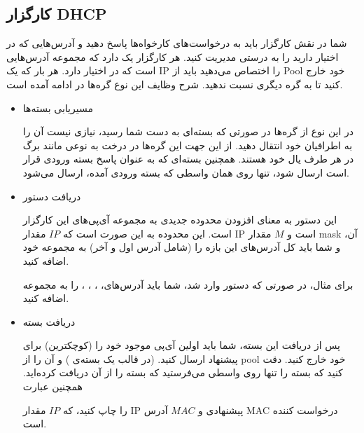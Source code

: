 \subsection{کارگزار DHCP}
شما در نقش کارگزار باید به درخواست‌های کارخواه‌ها پاسخ دهید و آدرس‌هایی که در اختیار دارید را به درستی مدیریت کنید. هر کارگزار یک
دارد که مجموعه آدرس‌هایی است که در اختیار دارد. هر بار که یک IP را اختصاص می‌دهید باید از Pool خود خارج کنید تا به گره دیگری نسبت ندهید. شرح وظایف این نوع گره‌ها در ادامه آمده است.

\begin{itemize}
\item
مسیریابی بسته‌ها

در این نوع از گره‌ها در صورتی که بسته‌ای به دست شما رسید، نیازی نیست آن را به اطرافیان خود انتقال دهید. از این جهت این گره‌ها در درخت به نوعی مانند برگ در هر طرف یال خود هستند. همچنین بسته‌ای که به عنوان پاسخ بسته ورودی قرار است ارسال شود، تنها روی همان واسطی که بسته ورودی آمده، ارسال می‌شود.

\item
دریافت دستور
\begin{flushleft}
\end{flushleft}

این دستور به معنای افزودن محدوده جدیدی به مجموعه  آی‌پی‌های این کارگزار است. این محدوده به این صورت است که
$IP$
مقدار 
IP
است و 
$M$
مقدار
mask
آن، و شما باید کل آدرس‌های این بازه را (شامل آدرس اول و آخر) به مجموعه خود اضافه کنید. 

برای مثال، در صورتی که دستور
وارد شد، شما باید آدرس‌های،
،
،
،
را به مجموعه اضافه کنید.



\item
دریافت بسته

پس از دریافت این بسته، شما باید اولین آی‌پی موجود خود را (کوچکترین) برای پیشنهاد ارسال کنید. (در قالب یک بسته‌ی
) و آن را از pool خود خارج کنید. دقت کنید که بسته را تنها روی واسطی می‌فرستید که بسته را از آن دریافت کرده‌اید. همچنین عبارت
\begin{flushleft}
\end{flushleft}
را چاپ کنید، که $IP$ مقدار IP  پیشنهادی و  $MAC$ آدرس MAC درخواست کننده است.


\end{itemize}
